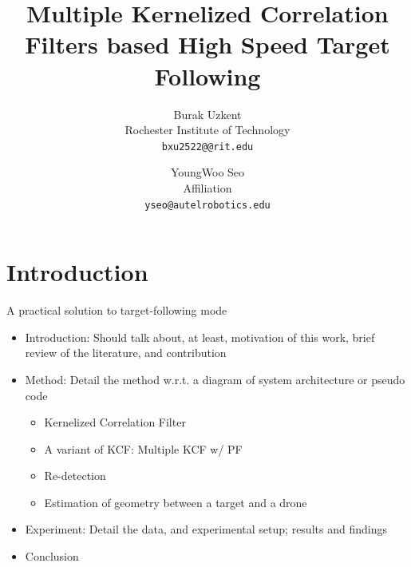 \documentclass[10pt,twocolumn,letterpaper]{article}
\begin{document}
\title{Multiple Kernelized Correlation Filters based High Speed Target Following}

\author{Burak Uzkent\\
Rochester Institute of Technology\\
{\tt\small bxu2522@@rit.edu}
\and
YoungWoo Seo\\
Affiliation\\
{\tt\small yseo@autelrobotics.edu}
}

\maketitle

\begin{abstract}

\end{abstract}

\section{Introduction}

A practical solution to target-following mode

\begin{itemize}
\item Introduction: Should talk about, at least, motivation of this
  work, brief review of the literature, and contribution
\item Method: Detail the method w.r.t. a diagram of system
  architecture or pseudo code
\begin{itemize}
\item Kernelized Correlation Filter
\item A variant of KCF: Multiple KCF w/ PF
\item Re-detection
\item Estimation of geometry between a target and a drone
\end{itemize}
\item Experiment: Detail the data, and experimental setup; results and findings
\item Conclusion
\end{itemize}
\end{document}

